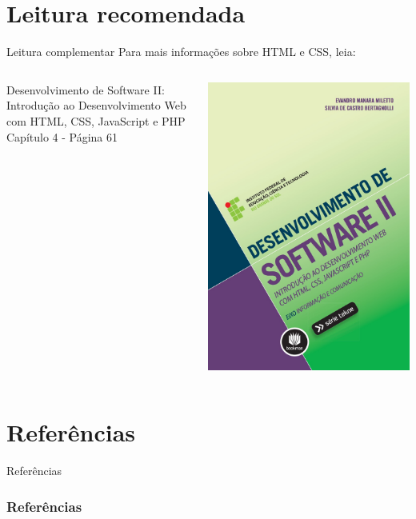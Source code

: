 \documentclass{beamer}
\begin{document}
\section{Leitura recomendada}
\begin{frame}{Leitura complementar}
 Para mais informações sobre HTML e CSS, leia:\\
 \begin{columns}
   \begin{column}{0.5\textwidth}
    Desenvolvimento de Software II: Introdução ao Desenvolvimento Web com HTML, CSS, JavaScript e PHP \\
     Capítulo 4 - Página 61\\ 
      \cite{miletto2014desenvolvimento}
   \end{column}
   \begin{column}{0.3\textwidth}
    \begin{center}
  \includegraphics[height=0.45\paperheight]{fig/aula3/milleto2014.jpeg} \\
 \end{center}
   \end{column}
 \end{columns}
\end{frame}

\section{Referências}
\begin{frame}{Referências}%
\frametitle{Referências}
\small
\begin{center}
\tiny


\end{center}
\end{frame}
 
\end{document}
